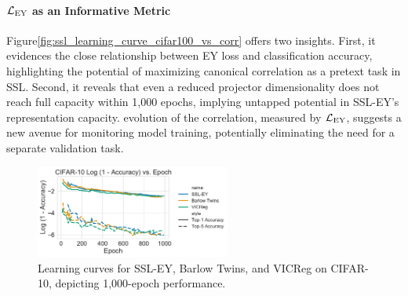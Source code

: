 \paragraph{$\mathcal{L}_\text{EY}$ as an Informative Metric} Figure\ref{fig:ssl_learning_curve_cifar100_vs_corr} offers two insights.
First, it evidences the close relationship between EY loss and classification accuracy, highlighting the potential of maximizing canonical correlation as a pretext task in SSL. Second, it reveals that even a reduced projector dimensionality does not reach full capacity within 1,000 epochs, implying untapped potential in SSL-EY's representation capacity.
evolution of the correlation, measured by $\mathcal{L}_\text{EY}$, suggests a new avenue for monitoring model training, potentially eliminating the need for a separate validation task.

\begin{figure}[H]
    \centering
    \includegraphics[width=0.57\textwidth]{figures/SSL/cifar10_learning_curve_log_error}
    \caption{Learning curves for SSL-EY, Barlow Twins, and VICReg on CIFAR-10, depicting 1,000-epoch performance.}
    \label{fig:ssl_learning_curve_cifar10_top5}
\end{figure}

